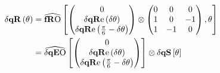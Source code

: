\newcommand\dqas[1][]{
  \ifstrempty{#1}{
    \mathbf{\delta qAS}
  }{
    \mathbf{\delta qAS}\left(#1\right)
  }
}


\begin{align*}
\dqR[\theta] &= \fROm \left[  
\begin{pmatrix}
 0                                     \\
 \dqRe[ \thetaA ]              \\
 \dqRe[ \Pii{6} -\thetaA]   \\
\end{pmatrix} \otimes
\begin{pmatrix}
 0  &    0  &   0  \\
 1  &    0  & -1  \\
 1  & - 1  &   0  \\
\end{pmatrix}
  ,\theta \right] \\
  &= \dqEO \left[ 
  \begin{pmatrix}
   0                                     \\
   \dqRe[ \thetaA ]              \\
   \dqRe[ \Pii{6} -\thetaA]   \\
  \end{pmatrix} 
  \right]
  \otimes
  \dqs \left[ \theta \right] 
\end{align*}

